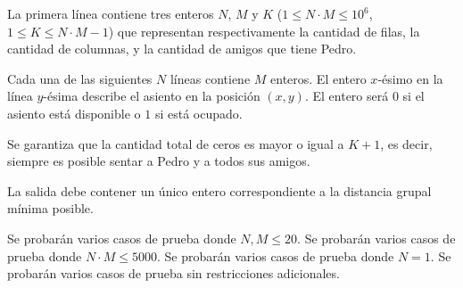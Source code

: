 \documentclass{oci}
\begin{document}
\begin{inputDescription}
La primera línea contiene tres enteros $N$, $M$ y $K$
($1 \leq N \cdot M \leq 10^6$, $1 \leq K \leq N \cdot M - 1$)
que representan respectivamente la cantidad de filas, la cantidad de columnas,
y la cantidad de amigos que tiene Pedro.

Cada una de las siguientes $N$ líneas contiene $M$ enteros.
%
El entero $x$-ésimo en la línea $y$-ésima describe el asiento
en la posición $(x, y)$.
%
El entero será $0$ si el asiento está disponible o $1$ si
está ocupado.

Se garantiza que la cantidad total de ceros es mayor o igual a $K+1$,
es decir, siempre es posible sentar a Pedro y a todos sus amigos.
\end{inputDescription}

\begin{outputDescription}
La salida debe contener un único entero correspondiente
a la distancia grupal mínima posible.
\end{outputDescription}

\begin{scoreDescription}
   Se probarán varios casos de prueba donde $N, M \leq 20$.
   Se probarán varios casos de prueba donde $N \cdot M \leq 5000$.
   Se probarán varios casos de prueba donde $N = 1$.
   Se probarán varios casos de prueba sin restricciones adicionales.
\end{scoreDescription}

\begin{sampleDescription}
\end{sampleDescription}
\end{document}
